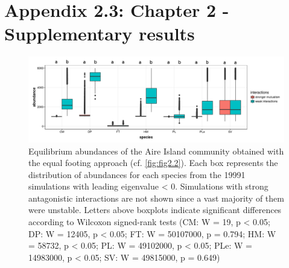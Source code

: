 \chapter[Appendix 2.3: Chapter 2 - Supplementary results]{Appendix 2.3: Chapter 2 - Supplementary results}\label{ch:Appendix2.3}
\renewcommand{\thefigure}{A.2.3.\arabic{figure}}
\setcounter{figure}{0}

\renewcommand{\thetable}{A.2.3.\arabic{table}}
\setcounter{table}{0}

\begin{figure}[ht]
\centering
\includegraphics[width=\textwidth]{./Figures/Appendix2_3/Fig_1.png}
\caption[Equal footing equilibrium abundances]{\color{Gray} Equilibrium abundances of the Aire Island community obtained with the equal footing approach (cf. \cref{fig:fig2.2}). Each box represents the distribution of abundances for each species from the 19991 simulations with leading eigenvalue < 0. Simulations with strong antagonistic interactions are not shown since a vast majority of them were unstable. Letters above boxplots indicate significant differences according to Wilcoxon signed-rank tests (CM: W = 19, p < 0.05; DP: W = 12405, p < 0.05; FT: W = 50107000, p = 0.794; HM: W = 58732, p < 0.05; PL: W = 49102000, p < 0.05; PLe: W = 14983000, p < 0.05; SV: W = 49815000, p = 0.649)}
\label{fig:figApp2.3.1}
\end{figure}


